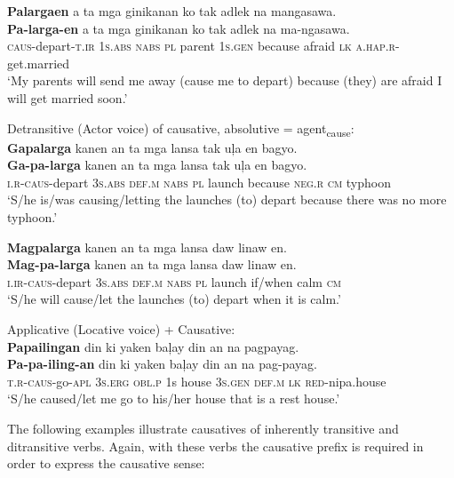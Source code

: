 \ea
\textbf{Palargaen}  a  ta  mga  ginikanan  ko  tak  adlek  na mangasawa. \\\smallskip
\gll \textbf{Pa-larga-en}  a  ta  mga  ginikanan  ko  tak  adlek  na ma-ngasawa. \\
\textsc{caus}-depart-\textsc{t.ir}  1\textsc{s.abs}  \textsc{nabs}  \textsc{pl}  parent  1\textsc{s.gen}  because  afraid  \textsc{lk} \textsc{a.hap.r}-get.married \\
\glt `My parents will send me away (cause me to depart) because (they) are afraid I will get married soon.’
\z

\ea
Detransitive (Actor voice) of causative, absolutive = agent\textsubscript{cause}: \\
\textbf{Gapalarga}  kanen  an  ta  mga  lansa  tak  uļa  en  bagyo. \\\smallskip
\gll \textbf{Ga-pa-larga}  kanen  an  ta  mga  lansa  tak  uļa  en  bagyo. \\
\textsc{i.r}-\textsc{caus}-depart  3\textsc{s.abs}  \textsc{def.m}  \textsc{nabs}  \textsc{pl}  launch  because  \textsc{neg.r}  \textsc{cm}  typhoon \\
\glt ‘S/he is/was causing/letting the launches (to) depart because there was no more typhoon.’
\z

\ea
\textbf{Magpalarga}  kanen  an  ta  mga  lansa  daw  linaw  en. \\\smallskip
\gll \textbf{Mag-pa-larga}  kanen  an  ta  mga  lansa  daw  linaw  en. \\
\textsc{i.ir}-\textsc{caus}-depart  3\textsc{s.abs}  \textsc{def.m}  \textsc{nabs}  \textsc{pl}  launch  if/when  calm  \textsc{cm} \\
\glt ‘S/he will cause/let the launches (to) depart when it is calm.’
\z


\ea
Applicative (Locative voice) + Causative: \\
\textbf{Papailingan}  din  ki  yaken  baļay  din  an  na  pagpayag. \\\smallskip
\gll \textbf{Pa-pa-iling-an}  din  ki  yaken  baļay  din  an  na  pag-payag. \\
\textsc{t.r}-\textsc{caus}-go-\textsc{apl}  3\textsc{s.erg}  \textsc{obl.p}  1s  house  3\textsc{s.gen}  \textsc{def.m}  \textsc{lk}  \textsc{red}-nipa.house \\
\glt ‘S/he caused/let me go to his/her house that is a rest house.’
\z

The following examples illustrate causatives of inherently transitive and ditransitive verbs. Again, with these verbs the causative prefix is required in order to express the causative sense:

